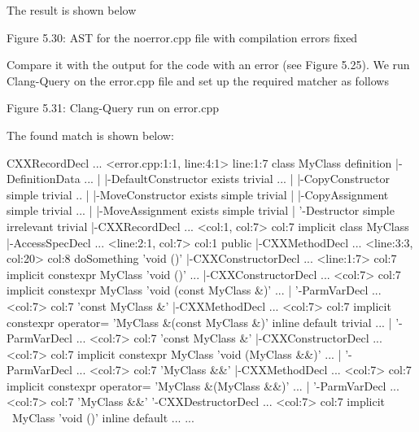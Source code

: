 The result is shown below


\begin{center}
Figure 5.30: AST for the noerror.cpp file with compilation errors fixed
\end{center}

Compare it with the output for the code with an error (see Figure 5.25). We run Clang-Query on the error.cpp file and set up the required matcher as follows


\begin{center}
Figure 5.31: Clang-Query run on error.cpp
\end{center}

The found match is shown below:

\begin{shell}
CXXRecordDecl ... <error.cpp:1:1, line:4:1> line:1:7 class MyClass
definition
|-DefinitionData ...
| |-DefaultConstructor exists trivial ...
| |-CopyConstructor simple trivial ..
| |-MoveConstructor exists simple trivial
| |-CopyAssignment simple trivial ...
| |-MoveAssignment exists simple trivial
| '-Destructor simple irrelevant trivial
|-CXXRecordDecl ... <col:1, col:7> col:7 implicit class MyClass
|-AccessSpecDecl ... <line:2:1, col:7> col:1 public
|-CXXMethodDecl ... <line:3:3, col:20> col:8 doSomething 'void ()'
|-CXXConstructorDecl ... <line:1:7> col:7 implicit constexpr MyClass
'void ()' ...
|-CXXConstructorDecl ... <col:7> col:7 implicit constexpr MyClass
'void (const MyClass &)' ...
| '-ParmVarDecl ... <col:7> col:7 'const MyClass &'
|-CXXMethodDecl ... <col:7> col:7 implicit constexpr operator= 'MyClass
&(const MyClass &)' inline default trivial ...
| '-ParmVarDecl ... <col:7> col:7 'const MyClass &'
|-CXXConstructorDecl ... <col:7> col:7 implicit constexpr MyClass 'void
(MyClass &&)' ...
| '-ParmVarDecl ... <col:7> col:7 'MyClass &&'
|-CXXMethodDecl ... <col:7> col:7 implicit constexpr operator= 'MyClass
&(MyClass &&)' ...
| '-ParmVarDecl ... <col:7> col:7 'MyClass &&'
'-CXXDestructorDecl ... <col:7> col:7 implicit ~MyClass 'void ()' inline
default ...
...
\end{shell}

